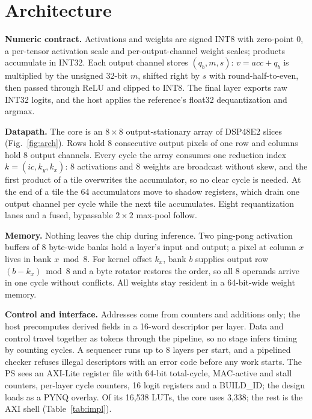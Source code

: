 \section{Architecture}\label{sec:arch}


\textbf{Numeric contract.} Activations and weights are signed INT8 with
zero-point 0, a per-tensor activation scale and per-output-channel weight
scales; products accumulate in INT32. Each output channel stores
$(q_b, m, s)$: $v = \mathit{acc} + q_b$ is multiplied by the unsigned 32-bit
$m$, shifted right by $s$ with round-half-to-even, then passed through ReLU
and clipped to INT8. %
The final layer exports raw INT32 logits, and the host applies the
reference's float32 dequantization and argmax.

\textbf{Datapath.} The core is an $8{\times}8$ output-stationary array of
DSP48E2 slices (Fig.~\ref{fig:arch}). Rows hold 8 consecutive output pixels
of one row and columns hold 8 output channels. Every cycle the array
consumes one reduction index $k = (ic, k_y, k_x)$: 8 activations and 8
weights are broadcast without skew, and the first product of a tile
overwrites the accumulator, so no clear cycle is needed. At the end of a
tile the 64 accumulators move to shadow registers, which drain one output
channel per cycle while the next tile accumulates. Eight requantization
lanes and a fused, bypassable $2{\times}2$ max-pool follow.

\textbf{Memory.} Nothing leaves the chip during inference. Two ping-pong
activation buffers of 8 byte-wide banks hold a layer's input and output; a
pixel at column $x$ lives in bank $x \bmod 8$. For kernel offset $k_x$,
bank $b$ supplies output row $(b - k_x) \bmod 8$ and a byte rotator restores
the order, so all 8 operands arrive in one cycle without conflicts. All
weights stay resident in a 64-bit-wide weight memory.

\textbf{Control and interface.} Addresses come from counters and additions
only; the host precomputes derived fields in a 16-word descriptor per layer.
Data and control travel together as tokens through the pipeline, so no
stage infers timing by counting cycles. A sequencer runs up to 8 layers per
start, and a pipelined checker refuses illegal descriptors with an error
code before any work starts. %
The PS sees an AXI-Lite register file with 64-bit total-cycle, MAC-active
and stall counters, per-layer cycle counters, 16 logit registers and a
BUILD\_ID; the design loads as a PYNQ overlay. %
Of its 16,538 LUTs, the core uses 3,338; the rest is the AXI shell
(Table~\ref{tab:impl}). %

